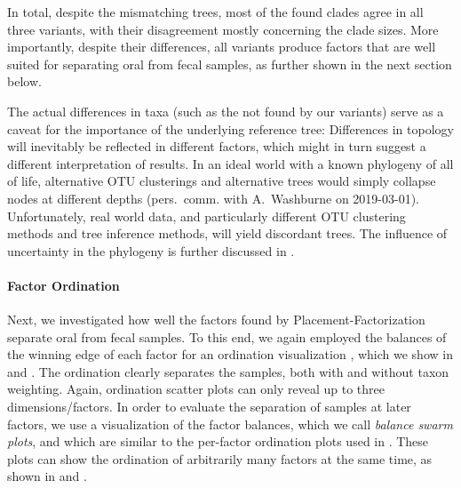 In total, despite the mismatching trees, most of the found clades agree in all three variants,
with their disagreement mostly concerning the clade sizes.
More importantly, despite their differences,
all variants produce factors that are well suited for separating oral from fecal samples,
as further shown in the next section below. %

The actual differences in taxa (such as the  not found by our variants)
serve as a caveat for the importance of the underlying reference tree:
Differences in topology will inevitably be reflected in different factors,
which might in turn suggest a different interpretation of results.
In an ideal world with a known phylogeny of all of life, alternative OTU clusterings and alternative trees
would simply collapse nodes at different depths (pers.~comm. with A.~Washburne on 2019-03-01).
Unfortunately, real world data, and particularly different OTU clustering methods and tree inference methods,
will yield discordant trees.
The influence of uncertainty in the phylogeny is further discussed in .



\paragraph{Factor Ordination}
\label{ch:Factorization:sec:Evaluation:sub:OralFecalHMPDataset:par:Ordination}

Next, we investigated how well the factors found by Placement-Factorization separate oral from fecal samples.
To this end, we again employed the balances of the winning edge of each factor for an ordination visualization \cite{Washburne2017a},
which we show in 
and .
The ordination clearly separates the samples, both with and without taxon weighting.
Again, ordination scatter plots can only reveal up to three dimensions/factors.
In order to evaluate the separation of samples at later factors,
we use a visualization of the factor balances, which we call \emph{balance swarm plots},
and which are similar to the per-factor ordination plots used in .
These plots can show the ordination of arbitrarily many factors at the same time,
as shown in 
and .

